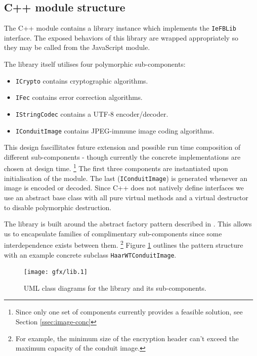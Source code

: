 \subsection{C++ module structure}

    The C++ module contains a library instance which implements the {\tt IeFBLib} interface. The exposed behaviors of this library are wrapped appropriately so they may be called from the JavaScript module.
    
    The library itself utilises four polymorphic sub-components:
    
    \begin{itemize}
    
        \item {\tt ICrypto} contains cryptographic algorithms.
        \item {\tt IFec} contains error correction algorithms.
        \item {\tt IStringCodec} contains a UTF-8 encoder/decoder.
        \item {\tt IConduitImage} contains JPEG-immune image coding algorithms.
    
    \end{itemize}
    
    This design fascillitates future extension and possible run time composition of different sub-components - though currently the concrete implementations are chosen at design time. \footnote{Since only one set of components currently provides a feasible solution, see Section \ref{ssec:image-conc}} The first three components are instantiated upon initialisation of the module. The last ({\tt IConduitImage}) is generated whenever an image is encoded or decoded. Since C++ does not natively define interfaces we use an abstract base class with all pure virtual methods and a virtual destructor to disable polymorphic destruction.
    
    The library is built around the abstract factory pattern described in \cite{dpatterns}. This allows us to encapsulate families of complimentary sub-components since some interdependence exists between them. \footnote{For example, the minimum size of the encryption header can't exceed the maximum capacity of the conduit image.} Figure \ref{uml:lib-classes} outlines the pattern structure with an example concrete subclass {\tt HaarWTConduitImage}.
    
    \begin{figure}[tb]
        \begin{center}
                \texttt{[image: gfx/lib.1]}
            \caption{UML class diagrams for the library and its sub-components.}
            \label{uml:lib-classes}
        \end{center}
    \end{figure}
    
